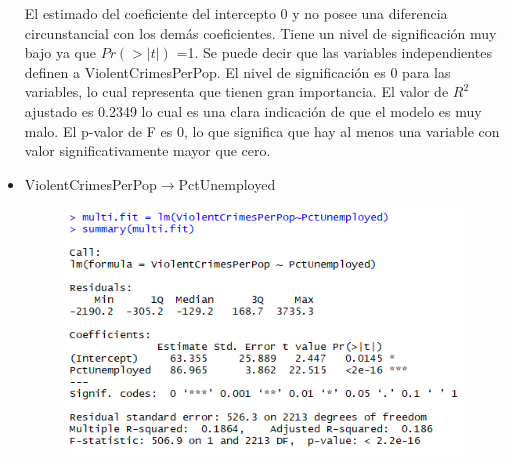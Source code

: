 \documentclass[a4paper,10pt,twocolumn]{article}
\begin{document}
\begin{itemize}
	El estimado del coeficiente del intercepto 0 y no posee una diferencia circunstancial con los demás coeficientes. Tiene un nivel de significación muy bajo ya que $Pr(> | t | )$ =1.
	Se puede decir que las variables independientes definen a ViolentCrimesPerPop. El nivel de significación es 0 para las variables, lo cual representa que tienen gran importancia. El valor de $R^2$ ajustado es 0.2349 lo cual es una clara indicación de que el modelo es muy malo. El p-valor de F es 0, lo que significa que hay al menos una variable con valor significativamente mayor que cero.

	\item{ViolentCrimesPerPop$\rightarrow$PctUnemployed}
			
			
			
			
			
		\begin{figure}[H]
			\begin{center}
				\includegraphics[width=.92\columnwidth,right]{figures/multifit3.png}
			\end{center}
		\end{figure}


\end{itemize}
\end{document}
